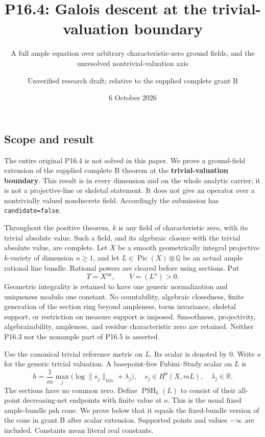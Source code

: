 \documentclass[
  11pt,
]{article}
\title{P16.4: Galois descent at the trivial-valuation boundary}
\subtitle{A full ample equation over arbitrary characteristic-zero
ground fields, and the unresolved nontrivial-valuation axis}
\author{Unverified research draft; relative to the supplied complete
grant B}
\date{6 October 2026}
\begin{document}
\maketitle

\subsection{Scope and result}\label{scope-and-result}

The entire original P16.4 is not solved in this paper. We prove a
ground-field extension of the supplied complete B theorem at the
\textbf{trivial-valuation boundary}. This result is in every dimension
and on the whole analytic carrier; it is not a projective-line or
skeletal statement. It does not give an operator over a nontrivially
valued nondiscrete field. Accordingly the submission has
\texttt{candidate=false}.

Throughout the positive theorem, \(k\) is any field of characteristic
zero, with its trivial absolute value. Such a field, and its algebraic
closure with the trivial absolute value, are complete. Let \(X\) be a
smooth geometrically integral projective \(k\)-variety of dimension
\(n\geq1\), and let \(L\in\operatorname{Pic}(X)\otimes\mathbb Q\) be an
actual ample rational line bundle. Rational powers are cleared before
using sections. Put \[
 T=X^{\mathrm{an}},\qquad V=(L^n)>0.
\] Geometric integrality is retained to have one generic normalization
and uniqueness modulo one constant. No countability, algebraic
closedness, finite generation of the section ring beyond ampleness,
torus invariance, skeletal support, or restriction on measure support is
imposed. Smoothness, projectivity, algebraizability, ampleness, and
residue characteristic zero are retained. Neither P16.3 nor the nonample
part of P16.5 is asserted.

Use the canonical trivial reference metric on \(L\). Its scalar is
denoted by \(0\). Write \(o\) for the generic trivial valuation. A
basepoint-free Fubini--Study scalar on \(L\) is \[
 h=\frac1m\max_j\bigl(\log\|s_j\|_{\mathrm{triv}}+\lambda_j\bigr),
 \quad s_j\in H^0(X,mL),\quad\lambda_j\in\mathbb R.
 \tag{1}
\] The sections have no common zero. Define \(\operatorname{PSH}_k(L)\)
to consist of their all-point decreasing-net endpoints with finite value
at \(o\). This is the usual fixed ample-bundle psh cone. We prove below
that it equals the fixed-bundle version of the cone in grant B after
scalar extension. Supported points and values \(-\infty\) are included.
Constants mean literal real constants.
\end{document}

